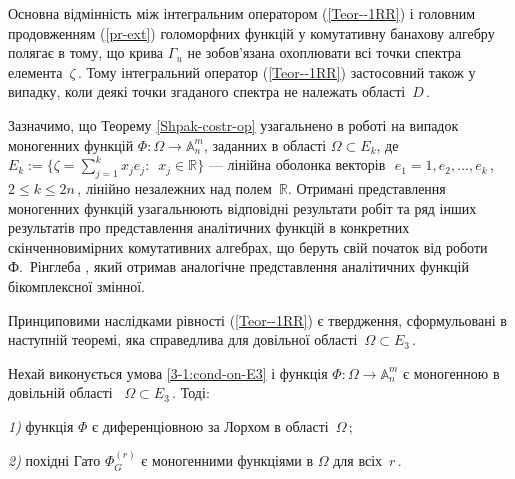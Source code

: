 \documentclass[11pt, reqno]{amsart}
\begin{document}
\vskip 1mm


\begin{remark}\label{3-1:Rem-int-op-sim-pe}
Основна відмінність між інтегральним оператором (\ref{Teor--1RR})
і головним продовженням (\ref{pr-ext}) голоморфних функцій у комутативну банахову алгебру полягає в тому, що крива
$\Gamma_u$ не зобов'язана охоплювати всі точки спектра елемента\, $\zeta$\,.
Тому інтегральний оператор (\ref{Teor--1RR})
застосовний також у випадку, коли деякі точки згаданого спектра не належать області\, $D$\,.
\end{remark}



Зазначимо, що Теорему \ref{Shpak-costr-op} узагальнено в роботі \cite{Sh25} на випадок
моногенних функцій $\Phi : \Omega\rightarrow \mathbb{A}_n^m$, заданних в області
$\Omega\subset E_k$, де
$E_k:=\{\zeta=\sum\limits_{j=1}^k x_{j}e_j:\,\,\,x_j\in\mathbb{R}\}$ ---
лінійна оболонка векторів\,\, $e_1=1,e_2,\dots,e_k$\,, $2\leq k\leq 2n$\,,
лінійно незалежних над полем\, $\mathbb{R}$.
Отримані представлення моногенних функцій
узагальнюють  відповідні результати робіт
 \cite{Pl-Gr-big,Pl-Shp1,PlPu13,Pukh-5,Pl-Shp-Al} та ряд інших результатів про представлення аналітичних
функцій в конкретних скінченновимірних комутативних алгебрах, що
беруть свій початок від роботи Ф.~Рінглеба \cite{Ringleb}, який
отримав аналогічне представлення аналітичних функцій бікомплексної змінної.


Принциповими наслідками рівності (\ref{Teor--1RR}) є твердження, сформульовані в
наступній теоремі, яка справедлива для довільної області\, $\Omega\subset E_3$\,.

\begin{theorem}\label{3-1:teo_pro_naslidky2}
Нехай виконується умова \eqref{3-1:cond-on-E3}
і функція $\Phi : \Omega\rightarrow \mathbb{A}_n^m$ є моногенною в довільній області \, $\Omega\subset E_3$\,.
Тоді:

\emph{1)} функція $\Phi$ є диференціовною за Лорхом в області\, $\Omega$\,;

\emph{2)} похідні Гато $\Phi_G^{(r)}$ є моногенними функціями в $\Omega$ для всіх\, $r$\,.
\end{theorem}
\end{document}

